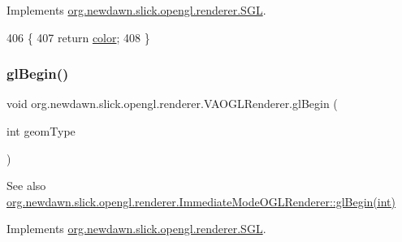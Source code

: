 Implements \mbox{\hyperlink{interfaceorg_1_1newdawn_1_1slick_1_1opengl_1_1renderer_1_1_s_g_l_a212dd49f0deb91e38d917b5702704863}{org.\+newdawn.\+slick.\+opengl.\+renderer.\+S\+GL}}.


\begin{DoxyCode}
406                                      \{
407         \textcolor{keywordflow}{return} \mbox{\hyperlink{classorg_1_1newdawn_1_1slick_1_1opengl_1_1renderer_1_1_v_a_o_g_l_renderer_aff2f26ed4c579285e854a123093f3315}{color}};
408     \}
\end{DoxyCode}
\mbox{\label{classorg_1_1newdawn_1_1slick_1_1opengl_1_1renderer_1_1_v_a_o_g_l_renderer_ad75148fef06b01d129847e657f19a561}} 
\subsubsection{\texorpdfstring{gl\+Begin()}{glBegin()}}
{\footnotesize\ttfamily void org.\+newdawn.\+slick.\+opengl.\+renderer.\+V\+A\+O\+G\+L\+Renderer.\+gl\+Begin (\begin{DoxyParamCaption}\item[{int}]{geom\+Type }\end{DoxyParamCaption})\hspace{0.3cm}{\ttfamily [inline]}}

\begin{DoxySeeAlso}{See also}
\mbox{\hyperlink{classorg_1_1newdawn_1_1slick_1_1opengl_1_1renderer_1_1_immediate_mode_o_g_l_renderer_a284c45b331dcb985b62dc903dddc9a37}{org.\+newdawn.\+slick.\+opengl.\+renderer.\+Immediate\+Mode\+O\+G\+L\+Renderer\+::gl\+Begin(int)}} 
\end{DoxySeeAlso}


Implements \mbox{\hyperlink{interfaceorg_1_1newdawn_1_1slick_1_1opengl_1_1renderer_1_1_s_g_l_a34ef78aa5f8f5774c06117a01932fb02}{org.\+newdawn.\+slick.\+opengl.\+renderer.\+S\+GL}}.


